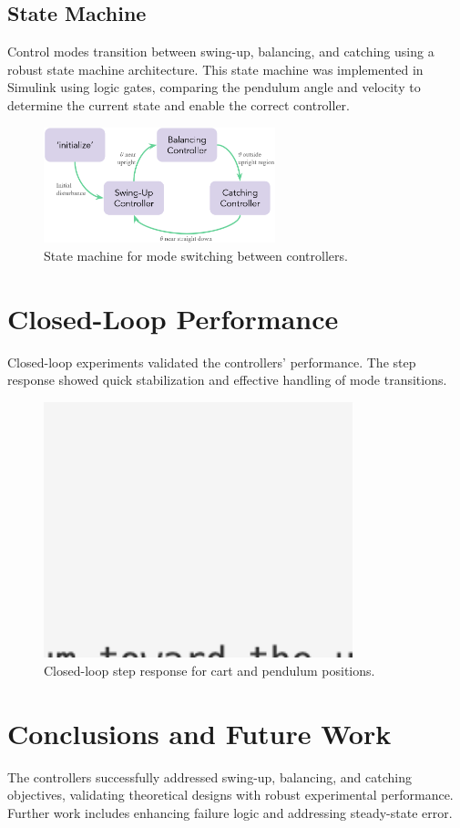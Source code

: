 \documentclass[12pt]{article}
\begin{document}
\subsection{State Machine}
Control modes transition between swing-up, balancing, and catching using a robust state machine architecture.
This state machine was implemented in Simulink using logic gates, comparing the pendulum angle and velocity to determine the current state and enable the correct controller.

\begin{figure}[H]
    \centering
    \includegraphics[width=0.6\textwidth]{figures/state_machine.png}
    \caption{State machine for mode switching between controllers.}
    \label{fig:state_machine}
\end{figure}

\section{Closed-Loop Performance}

Closed-loop experiments validated the controllers' performance. The step response showed quick stabilization and effective handling of mode transitions.

\begin{figure}[H]
    \centering
    \includegraphics[width=0.8\textwidth]{figures/ph.png}
    \caption{Closed-loop step response for cart and pendulum positions.}
    \label{fig:step_response}
\end{figure}

\section{Conclusions and Future Work}
The controllers successfully addressed swing-up, balancing, and catching objectives, validating theoretical designs with robust experimental performance. Further work includes enhancing failure logic and addressing steady-state error.



\end{document}
